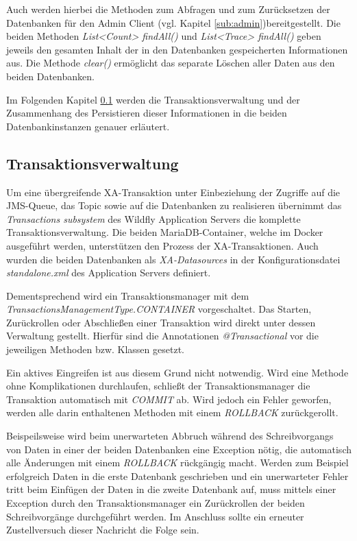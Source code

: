 \documentclass[10pt,journal,compsoc]{IEEEtran}
\begin{document}
Auch werden hierbei die Methoden zum Abfragen und zum Zurücksetzen der Datenbanken für den Admin Client (vgl. Kapitel \ref{sub:admin})bereitgestellt. Die beiden Methoden \textit{List<Count> findAll()} und \textit{List<Trace> findAll()} geben jeweils den gesamten Inhalt der in den Datenbanken gespeicherten Informationen aus. Die Methode \textit{clear()} ermöglicht das separate Löschen aller Daten aus den beiden Datenbanken. 

Im Folgenden Kapitel \ref{sub:transactions} werden die Transaktionsverwaltung und der Zusammenhang des Persistieren dieser Informationen in die beiden Datenbankinstanzen genauer erläutert. 
\subsection{Transaktionsverwaltung}
\label{sub:transactions}
Um eine übergreifende XA-Transaktion unter Einbeziehung der Zugriffe auf die JMS-Queue, das Topic sowie auf die Datenbanken zu realisieren übernimmt das \textit{Transactions subsystem} des Wildfly Application Servers die komplette Transaktionsverwaltung. Die beiden MariaDB-Container, welche im Docker ausgeführt werden, unterstützen den Prozess der XA-Transaktionen. Auch wurden die beiden Datenbanken als \textit{XA-Datasources} in der Konfigurationsdatei \textit{standalone.xml} des Application Servers definiert. 

Dementsprechend wird ein Transaktionsmanager mit dem \textit{TransactionsManagementType.CONTAINER} vorgeschaltet. Das Starten, Zurückrollen oder Abschließen einer Transaktion wird direkt unter dessen Verwaltung gestellt. Hierfür sind die Annotationen \textit{@Transactional} vor die jeweiligen Methoden bzw. Klassen gesetzt. 

Ein aktives Eingreifen ist aus diesem Grund nicht notwendig. Wird eine Methode ohne Komplikationen durchlaufen, schließt der Transaktionsmanager die Transaktion automatisch mit \textit{COMMIT} ab. Wird jedoch ein Fehler geworfen, werden alle darin enthaltenen Methoden mit einem \textit{ROLLBACK} zurückgerollt.

Beispeilsweise wird beim unerwarteten Abbruch während des Schreibvorgangs von Daten in einer der beiden Datenbanken eine Exception nötig, die automatisch alle Änderungen mit einem \textit{ROLLBACK} rückgängig macht. Werden zum Beispiel erfolgreich Daten in die erste Datenbank geschrieben und ein unerwarteter Fehler tritt beim Einfügen der Daten in die zweite Datenbank auf, muss mittels einer Exception durch den Transaktionsmanager ein Zurückrollen der beiden Schreibvorgänge durchgeführt werden. Im Anschluss sollte ein erneuter Zustellversuch dieser Nachricht die Folge sein. 
\end{document}
